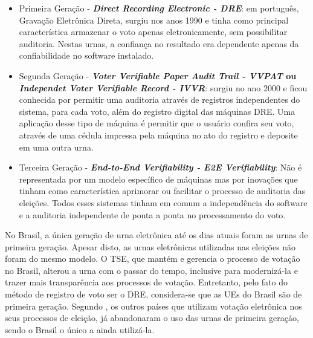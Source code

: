 \documentclass[portuguese]{textolivre}
\begin{document}
	
	\begin{itemize}
		
		\item Primeira Geração - \textbf{\emph{Direct Recording Electronic - DRE}}: em português, Gravação Eletrônica Direta, surgiu nos anos 1990 e tinha como principal característica armazenar o voto apenas eletronicamente, sem possibilitar auditoria. Nestas urnas, a confiança no resultado era dependente apenas da confiabilidade no software instalado.
		\item Segunda Geração - \textbf{\emph{Voter Verifiable Paper Audit Trail - VVPAT} ou \emph{Independet Voter Verifiable Record - IVVR}}: surgiu no ano 2000 e ficou conhecida por permitir uma auditoria através de registros independentes do sistema, para cada voto, além do registro digital das máquinas DRE. Uma aplicação desse tipo de máquina é permitir que o usuário confira seu voto, através de uma cédula impressa pela máquina no ato do registro e deposite em uma outra urna.%
		\item Terceira Geração - \textbf{\emph{End-to-End Verifiability - E2E Verifiability}}: Não é representada por um modelo específico de máquinas mas por inovações que tinham como característica aprimorar ou facilitar o processo de auditoria das eleições. Todos esses sistemas tinham em comum a independência do software e a auditoria independente de ponta a ponta no processamento do voto.%
		
	\end{itemize}
	
	
	No Brasil, a única geração de urna eletrônica até os dias atuais foram as urnas de primeira geração. Apesar disto, as urnas eletrônicas utilizadas nas eleições não foram do mesmo modelo. O TSE, que mantém e gerencia o processo de votação no Brasil, alterou a urna com o passar do tempo, inclusive para modernizá-la e trazer mais transparência aos processos de votação. Entretanto, pelo fato do método de registro de voto ser o DRE, considera-se que as UEs do Brasil são de primeira geração. Segundo \textcite{brunazo2016modelos}, os outros países que utilizam votação eletrônica nos seus processos de eleição, já abandonaram o uso das urnas de primeira geração, sendo o Brasil o único a ainda utilizá-la. %
	
\end{document}
